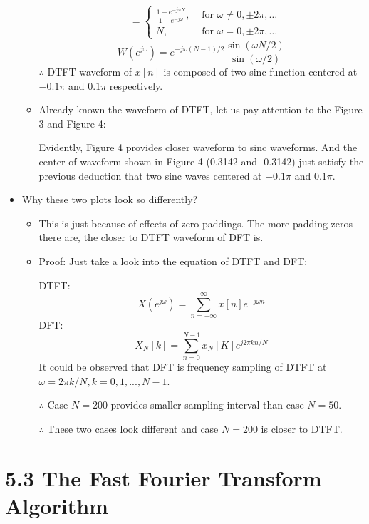 \documentclass[onecolumn,oneside]{SUSTechHomework}
\begin{document}
\begin{itemize}
\begin{itemize}
$$\begin{aligned}
				&=\left\{\begin{array}{ll}\frac{1-e^{-j \omega N}}{1-e^{-j \omega}}, & \text { for } \omega \neq 0, \pm 2 \pi, \ldots 
					\\N, & \text { for } \omega=0, \pm 2 \pi, \ldots\end{array}\right.
			\end{aligned}
			$$
			$$
			W\left(e^{j \omega}\right)=e^{-j \omega(N-1) / 2} \frac{\sin (\omega N / 2)}{\sin (\omega / 2)}
			$$
			$\therefore$ DTFT waveform of $x[n]$ is composed of two sinc function centered at $-0.1\pi$ and $0.1\pi$ respectively.
			\item Already known the waveform of DTFT, let us pay attention to the Figure 3 and Figure 4:\par
			Evidently, Figure 4 provides closer waveform to sinc waveforms. And the center of waveform shown in
			Figure 4 (0.3142 and -0.3142) just satisfy the previous deduction that two sinc waves centered at $-0.1\pi$ and $0.1\pi$.
		\end{itemize}
		\item Why these two plots look so differently?
		\begin{itemize}
			\item This is just because of effects of zero-paddings. The more padding zeros there are, the closer to
			DTFT waveform of DFT is.
			\item Proof: Just take a look into the equation of DTFT and DFT:\par
			DTFT:
			$$
			X(e^{j\omega})=\sum_{n=-\infty}^{\infty}x[n]e^{-j\omega n}
			$$
			DFT:
			$$
			X_N[k]=\sum_{n=0}^{N-1}x_N[K]e^{j2\pi kn/N}
			$$
			It could be observed that DFT is frequency sampling of DTFT at $\omega=2\pi k/N, k=0,1,...,N-1$.\par
			$\therefore$ Case $N=200$ provides smaller sampling interval than case $N=50$.\par
			$\therefore$ These two cases look different and case $N=200$ is closer to DTFT.
		\end{itemize}         
\end{itemize}
\section*{5.3 The Fast Fourier Transform Algorithm}
\end{document}
